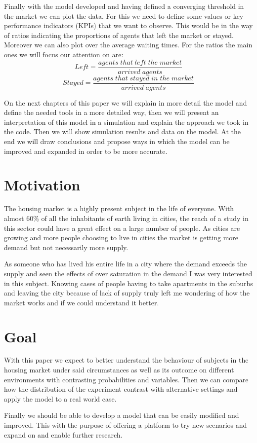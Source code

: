 Finally with the model developed and having defined a converging threshold in the market we can plot the data. For this we need to define some values or key performance indicators (KPIs) that we want to observe. This would be in the way of ratios indicating the proportions of agents that left the market or stayed. Moreover we can also plot over the average waiting times. For the ratios the main ones we will focus our attention on are:
\begin{equation} \label{eq9}
Left = \frac{agents \; that \; left \; the \; market}{arrived \; agents}
\end{equation}
\begin{equation} \label{eq9}
Stayed = \frac{agents \; that \; stayed \; in \; the \; market}{arrived \; agents}
\end{equation}

On the next chapters of this paper we will explain in more detail the model and define the needed tools in a more detailed way, then we will present an interpretation of this model in a simulation and explain the approach we took in the code. Then we will show simulation results and data on the model. At the end we will draw conclusions and propose ways in which the model can be improved and expanded in order to be more accurate.

\section{Motivation}
The housing market is a highly present subject in the life of everyone. With almost 60\% of all the inhabitants of earth living in cities, the reach of a study in this sector could have a great effect on a large number of people. As cities are growing and more people choosing to live in cities the market is getting more demand but not necessarily more supply.

As someone who has lived his entire life in a city where the demand exceeds the supply and seen the effects of over saturation in the demand I was very interested in this subject. Knowing cases of people having to take apartments in the suburbs and leaving the city because of lack of supply truly left me wondering of how the market works and if we could understand it better.


\section{Goal}
With this paper we expect to better understand the behaviour of subjects in the housing market under said circumstances as well as its outcome on different environments with contrasting probabilities and variables. Then we can compare how the distribution of the experiment contrast with alternative settings and apply the model to a real world case.

Finally we should be able to develop a model that can be easily modified and improved. This with the purpose of offering a platform to try new scenarios and expand on and enable further research.